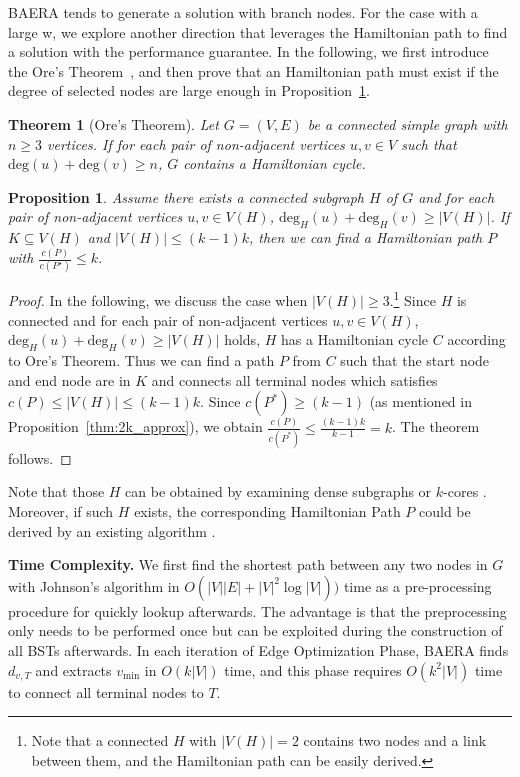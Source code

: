 \documentclass[conference]{IEEEtran}
\newtheorem{theorem}{Theorem}
\newtheorem{proposition}{Proposition}
\begin{document}
BAERA tends to generate a solution with branch nodes. For the case with a large w, we explore another direction that leverages the Hamiltonian path to find a solution with the performance guarantee. In the following, we first introduce the Ore's Theorem~\cite{Ore1960}, and then prove that an Hamiltonian path must exist if the degree of selected nodes are large enough in  Proposition~\ref{thm:no_branch}.

\begin{theorem}[Ore's Theorem]
Let $G=(V,E)$ be a connected simple graph with $n\geq 3$ vertices.
If for each pair of non-adjacent vertices
$u,v\in V$ such that $\mathrm{deg}(u)+\mathrm{deg}(v)\geq n$, $G$ contains a Hamiltonian cycle.
\end{theorem}



\begin{proposition}
Assume there exists a connected subgraph $H$ of $G$ and for each pair of non-adjacent vertices $u, v\in V(H)$, $\mathrm{deg}_{H}(u) + \mathrm{deg}_{H}(v)\geq |V(H)|$.
If $K\subseteq V(H)$ and $|V(H)|\leq (k-1)k$, then we can find a Hamiltonian
path $P$ with $\frac{c(P)}{c(P^{\star })}\leq k$.
\label{thm:no_branch}
\end{proposition}

\begin{proof}
In the following, we discuss the case when $|V(H)|\geq 3$.\footnote{Note that a connected $H$ with $|V(H)|=2$ contains two nodes and a link between them, and the Hamiltonian path can be easily derived.} Since $H$ is connected and for each pair of non-adjacent vertices $u, v\in V(H)$, $\mathrm{deg}_{H}(u) + \mathrm{deg}_{H}(v) \geq |V(H)|$ holds, $H$ has a Hamiltonian cycle $C$ according to Ore's Theorem. Thus we can find a path $P$ from $C$ such that the start node and end node are in $K$ and connects all terminal nodes which satisfies $c(P) \leq |V(H)|\leq (k-1)k$. Since $c(P^{*})\geq (k-1)$ (as mentioned in Proposition~\ref{thm:2k_approx}), we obtain $\frac{c(P)}{c(P^{*})}\leq \frac{(k-1)k}{k-1}=k$. The theorem follows.
\end{proof}

Note that those $H$ can be obtained by examining dense subgraphs \cite{Khuller09ICALP} or $k$-cores \cite{Seidman1983}. Moreover, if such $H$ exists, the corresponding Hamiltonian Path $P$ could be derived by an existing algorithm \cite{Palmer1997}.

\textbf{Time Complexity. }We first find the shortest path between any two
nodes in $G$ with Johnson's algorithm in $O(|V||E|+|V|^{2}\log |V|))$ time
as a pre-processing procedure for quickly lookup afterwards. The advantage is
that the preprocessing only needs to be performed once but can be exploited
during the construction of all BSTs afterwards. In each iteration of Edge Optimization Phase, BAERA finds $d_{v,T} $ and extracts $v_{\min }$ in $O(k|V|)$ time, and this phase
requires $O(k^{2}|V|)$ time to connect all terminal nodes to $T$.
\end{document}
